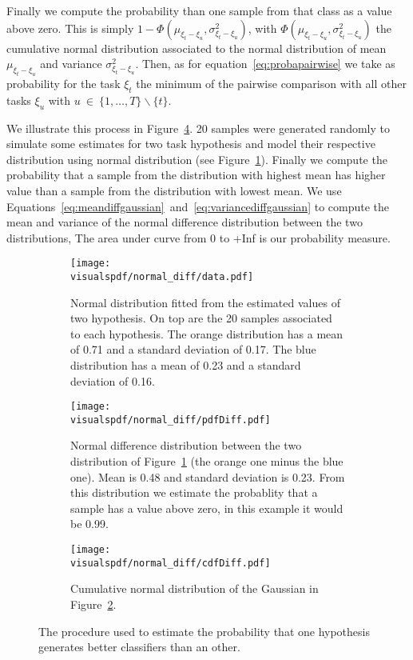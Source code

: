 Finally we compute the probability than one sample from that class as a value above zero. This is simply $1 - \Phi(\mu_{\xi_t - \xi_u}, \sigma^2_{\xi_t - \xi_u})$, with $\Phi(\mu_{\xi_t - \xi_u}, \sigma^2_{\xi_t - \xi_u})$ the cumulative normal distribution associated to the normal distribution of mean $\mu_{\xi_t - \xi_u}$ and variance $\sigma^2_{\xi_t - \xi_u}$. Then, as for equation~\ref{eq:probapairwise} we take as probability for the task  $\xi_t$ the minimum of the pairwise comparison with all other tasks $\xi_u$ with $u~\in~\{1, \ldots, T\} \smallsetminus \{t\}$.


We illustrate this process in Figure~\ref{fig:normaldifferencedistribution}. 20 samples were generated randomly to simulate some estimates for two task hypothesis and model their respective distribution using normal distribution (see Figure~\ref{fig:normaldifferencedistribution:data}). Finally we compute the probability that a sample from the distribution with highest mean has higher value than a sample from the distribution with lowest mean. We use Equations~\ref{eq:meandiffgaussian}~and~\ref{eq:variancediffgaussian} to compute the mean and variance of the normal difference distribution between the two distributions, The area under curve from 0 to +Inf is our probability measure.

\begin{figure}[!htbp]
\centering
    \begin{subfigure}[b]{\columnwidth}
        \centering
        \texttt{[image: \\visualspdf/normal\_diff/data.pdf]}
        \caption{Normal distribution fitted from the estimated values of two hypothesis. On top are the 20 samples associated to each hypothesis. The orange distribution has a mean of 0.71 and a standard deviation of 0.17. The blue distribution has a mean of 0.23 and a standard deviation of 0.16.}
        \label{fig:normaldifferencedistribution:data}
    \end{subfigure}
    \begin{subfigure}[b]{\columnwidth}
        \centering
        \texttt{[image: \\visualspdf/normal\_diff/pdfDiff.pdf]}
        \caption{Normal difference distribution between the two distribution of Figure~\ref{fig:normaldifferencedistribution:data} (the orange one minus the blue one). Mean is 0.48 and standard deviation is 0.23. From this distribution we estimate the probablity that a sample has a value above zero, in this example it would be 0.99.}
        \label{fig:normaldifferencedistribution:pdf}
    \end{subfigure}
    \begin{subfigure}[b]{\columnwidth}
        \centering
        \texttt{[image: \\visualspdf/normal\_diff/cdfDiff.pdf]}
        \caption{Cumulative normal distribution of the Gaussian in Figure~\ref{fig:normaldifferencedistribution:pdf}.}
        \label{fig:normaldifferencedistribution:cdf}
    \end{subfigure}
\caption{The procedure used to estimate the probability that one hypothesis generates better classifiers than an other.}
\label{fig:normaldifferencedistribution}
\end{figure}

